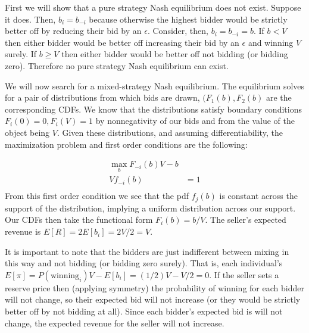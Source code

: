 \documentclass[11pt]{article} %
\begin{document}
First we will show that a pure strategy Nash equilibrium does not exist. Suppose it does. Then, $b_i = b_{-i}$ because otherwise the highest bidder would be strictly better off by reducing their bid by an $\epsilon$. Consider, then, $b_i = b_{-i} = b$. If $b<V$ then either bidder would be better off increasing their bid by an $\epsilon$ and winning $V$ surely. If $b\geq V$ then either bidder would be better off not bidding (or bidding zero). Therefore no pure strategy Nash equilibrium can exist.

We will now search for a mixed-strategy Nash equilibrium. The equilibrium solves for a pair of distributions from which bids are drawn, $(F_1(b),F_2(b)$ are the corresponding CDFs. We know that the distributions satisfy boundary conditions $F_i(0) = 0, F_i(V) = 1$ by nonnegativity of our bids and from the value of the object being $V$. Given these distributions, and assuming differentiability, the maximization problem and first order conditions are the following:

\begin{align*}
\max_{b} F_{-i}(b)V - b\\
Vf_{-i}(b) &= 1\\
\end{align*}
From this first order condition we see that the pdf $f_{j}(b)$ is constant across the support of the distribution, implying a uniform distribution across our support. Our CDFs then take the functional form $F_i(b) = b/V$. The seller's expected revenue is $E[R] = 2E[b_i] = 2V/2 = V$.

It is important to note that the bidders are just indifferent between mixing in this way and not bidding (or bidding zero surely). That is, each individual's $E[\pi] = P(\text{winning}_{i})V - E[b_i] = (1/2)V - V/2 = 0$. If the seller sets a reserve price then (applying symmetry) the probability of winning for each bidder will not change, so their expected bid will not increase (or they would be strictly better off by not bidding at all). Since each bidder's expected bid is will not change, the expected revenue for the seller will not increase.



%
%
\end{document}
